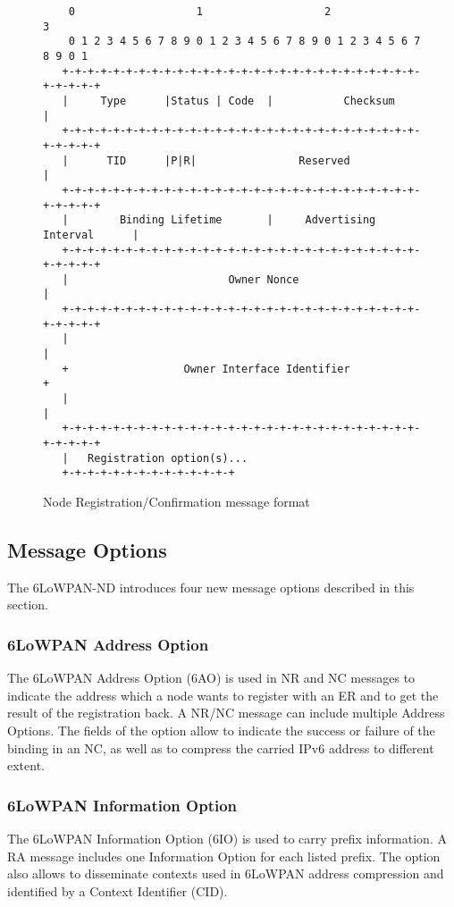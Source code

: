 \begin{figure}[htp]
\begin{mylisting}
\begin{verbatim}
    0                   1                   2                   3
    0 1 2 3 4 5 6 7 8 9 0 1 2 3 4 5 6 7 8 9 0 1 2 3 4 5 6 7 8 9 0 1
   +-+-+-+-+-+-+-+-+-+-+-+-+-+-+-+-+-+-+-+-+-+-+-+-+-+-+-+-+-+-+-+-+
   |     Type      |Status | Code  |           Checksum            |
   +-+-+-+-+-+-+-+-+-+-+-+-+-+-+-+-+-+-+-+-+-+-+-+-+-+-+-+-+-+-+-+-+
   |      TID      |P|R|                Reserved                   |
   +-+-+-+-+-+-+-+-+-+-+-+-+-+-+-+-+-+-+-+-+-+-+-+-+-+-+-+-+-+-+-+-+
   |        Binding Lifetime       |     Advertising Interval      |
   +-+-+-+-+-+-+-+-+-+-+-+-+-+-+-+-+-+-+-+-+-+-+-+-+-+-+-+-+-+-+-+-+
   |                         Owner Nonce                           |
   +-+-+-+-+-+-+-+-+-+-+-+-+-+-+-+-+-+-+-+-+-+-+-+-+-+-+-+-+-+-+-+-+
   |                                                               |
   +                  Owner Interface Identifier                   +
   |                                                               |
   +-+-+-+-+-+-+-+-+-+-+-+-+-+-+-+-+-+-+-+-+-+-+-+-+-+-+-+-+-+-+-+-+
   |   Registration option(s)...
   +-+-+-+-+-+-+-+-+-+-+-+-+-+
\end{verbatim}
\end{mylisting}
\caption{Node Registration/Confirmation message format}\label{fig:nr.nc.format}
\end{figure}

\subsection{Message Options}
The 6LoWPAN-ND introduces four new message options described in this section.

\subsubsection{6LoWPAN Address Option}\label{nd.option.address}
The 6LoWPAN Address Option (6AO) is used in NR and NC messages to indicate the address which a node wants to register with an ER and to get the result of the registration back. A NR/NC message can include multiple Address Options. The fields of the option allow to indicate the success or failure of the binding in an NC, as well as to compress the carried IPv6 address to different extent. 

\subsubsection{6LoWPAN Information Option}\label{nd.option.info}
The 6LoWPAN Information Option (6IO) is used to carry prefix information. A RA message includes one Information Option for each listed prefix.  The option also allows to disseminate contexts used in 6LoWPAN address compression and identified by a Context Identifier (CID).

